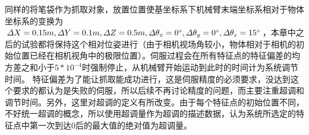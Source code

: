 \documentclass[fontset=fandol,type=bachelor,campus=harbin,bsmainpagenumberline=true]{hithesisbook}
\begin{document}
同样的将笔袋作为抓取对象，放置位置使基坐标系下机械臂末端坐标系相对于物体坐标系的变换为$\varDelta X=0.15m,\varDelta Y=0.1m,\varDelta Z=0.5m,\varDelta \theta _x=0\degree,\varDelta \theta _y=0\degree,\varDelta \theta _z=15\degree$，本章中之后的试验都将保持这个相对位姿进行（由于相机视场角较小，物体相对于相机的初始位置已经在相机视角中的极限位置）。伺服过程会在所有特征点的特征偏差的均方差之和小于$5*10^{-4}$时强制停止，从机械臂开始运动到此时的时间计为系统调节时间。
特征偏差为了能让抓取能成功进行，这是伺服精度的必须要求，没达到这个要求的都认为是失败的伺服，所以后续不再讨论精度的问题，而主要注重超调和调节时间。另外，这里对超调的定义有所改变。由于每个特征点的初始位置不同，不好统一超调的概念，所以使用超调量作为超调的描述数据，认为系统所选定的特征点中第一次到达0后的最大值的绝对值为超调量。
\begin{figure}[h]
	\centering
\end{figure}
\end{document}
